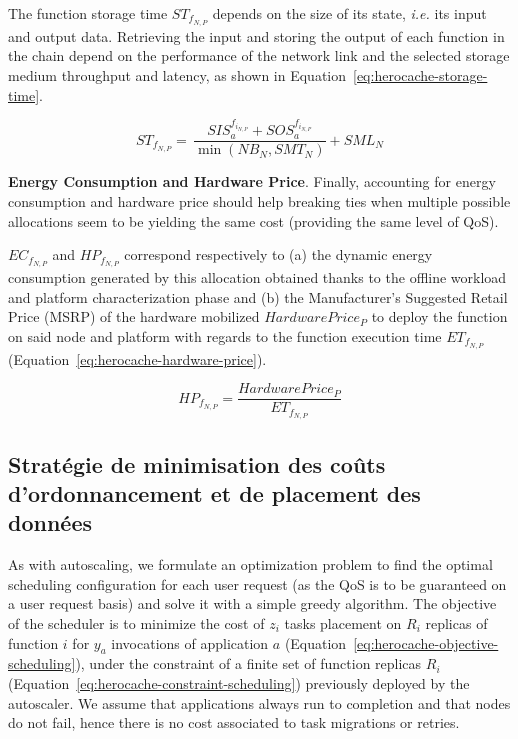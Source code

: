 The function storage time ${ST}_{{f}_{N, P}}$ depends on the size of its state, \textit{i.e.} its input and output data. Retrieving the input and storing the output of each function in the chain depend on the performance of the network link and the selected storage medium throughput and latency, as shown in Equation~\ref{eq:herocache-storage-time}.

\begin{equation}
    {ST}_{{f}_{N, P}} = \, \frac{SIS_{a}^{f_{i_{N, P}}} + SOS_{a}^{f_{i_{N, P}}}}{\min (NB_{N}, SMT_{N})} + SML_{N}
\label{eq:herocache-storage-time}
\end{equation}

\textbf{Energy Consumption and Hardware Price}. Finally, accounting for energy consumption and hardware price should help breaking ties when multiple possible allocations seem to be yielding the same cost (providing the same level of QoS).

${EC}_{{f}_{N, P}}$ and ${HP}_{{f}_{N, P}}$ correspond respectively to (a) the dynamic energy consumption generated by this allocation obtained thanks to the offline workload and platform characterization phase and (b) the Manufacturer's Suggested Retail Price (MSRP) of the hardware mobilized $Hardware Price_{P}$ to deploy the function on said node and platform with regards to the function execution time $ET_{{f}_{N, P}}$ (Equation~\ref{eq:herocache-hardware-price}).

\begin{equation}
    {HP}_{{f}_{N, P}} = \frac{Hardware Price_{P}}{ET_{{f}_{N, P}}}
\label{eq:herocache-hardware-price}
\end{equation}

\subsection{Stratégie de minimisation des coûts d'ordonnancement et de placement des données}

As with autoscaling, we formulate an optimization problem to find the optimal scheduling configuration for each user request (as the QoS is to be guaranteed on a user request basis) and solve it with a simple greedy algorithm. The objective of the scheduler is to minimize the cost of $z_i$ tasks placement on $R_i$ replicas of function $i$ for $y_a$ invocations of application $a$ (Equation~\ref{eq:herocache-objective-scheduling}), under the constraint of a finite set of function replicas $R_{i}$ (Equation~\ref{eq:herocache-constraint-scheduling}) previously deployed by the autoscaler.  %
We assume that applications always run to completion and that nodes do not fail, hence there is no cost associated to task migrations or retries.

